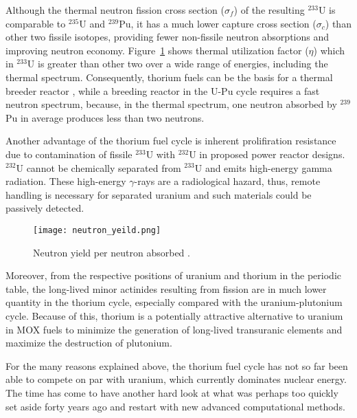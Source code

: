 Although the thermal neutron fission cross section ($\sigma_f$) of the resulting $^{233}$U is comparable to $^{235}$U and $^{239}$Pu, it has a much lower capture cross section ($\sigma_c$) than other two fissile isotopes, providing fewer non-fissile neutron absorptions and improving neutron economy. Figure~\ref{fig:n_yeild} shows thermal utilization factor ($\eta$) which in $^{233}$U is greater than other two over a wide range of energies, including the thermal spectrum. Consequently, thorium fuels can be the basis for a thermal breeder reactor \cite{iaea_thorium_2005}, while a breeding reactor in the U-Pu cycle requires a fast neutron spectrum, because, in the thermal spectrum, one neutron absorbed by $^{239}$Pu in average produces less than two neutrons.

Another advantage of the thorium fuel cycle is inherent prolifiration resistance due to contamination of fissile $^{233}$U with $^{232}$U in proposed power reactor designs. $^{232}$U cannot be chemically separated from $^{233}$U and  emits high-energy gamma radiation. These high-energy $\gamma$-rays are a radiological hazard, thus, remote handling is necessary for separated uranium and such materials could be passively detected.

\begin{figure}[htbp!] %
  \centering
  \vspace{-0.3em}
  \texttt{[image: neutron\_yeild.png]}
  \caption{Neutron yield per neutron absorbed \cite{anon_plutonium_1989}.}
  \vspace{-0.6em}
  \label{fig:n_yeild}
\end{figure}
\FloatBarrier

Moreover, from the respective positions of uranium and thorium in the periodic table, the long-lived minor actinides resulting from fission are in much lower quantity in the thorium cycle, especially compared with the uranium-plutonium cycle. Because of this, thorium is a potentially attractive alternative to uranium in \gls{MOX} fuels to minimize the generation of long-lived transuranic elements and maximize the destruction of plutonium.

For the many reasons explained above, the thorium fuel cycle has not so far been able to compete on par with uranium, which currently dominates nuclear energy. The time has come to have another hard look at what was perhaps too quickly set aside forty years ago and restart with new advanced computational methods. 

